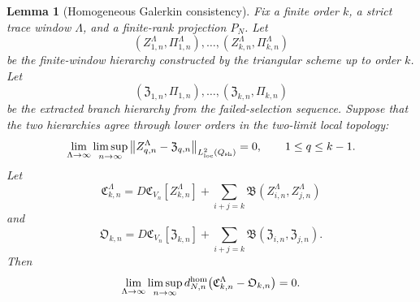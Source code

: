\documentclass[11pt]{article}
\numberwithin{equation}{section}
\theoremstyle{plain}
\newtheorem{lemma}{Lemma}[section]
\theoremstyle{definition}
\theoremstyle{remark}
\newcommand{\norm}[2]{\left\|#1\right\|_{#2}}
\newcommand{\calB}{\mathfrak B}
\newcommand{\calC}{\mathfrak C}
\newcommand{\frakZ}{\mathfrak Z}
\newcommand{\frakPi}{\mathfrak{\Pi}}
\newcommand{\Ored}{\mathfrak O}
\begin{document}
\begin{lemma}[Homogeneous Galerkin consistency]\label{pIV:lem:homogeneous-galerkin-consistency}
Fix a finite order \(k\), a strict trace window \(\Lambda\), and a finite-rank
projection \(P_N\).  Let
\[
        (Z^\Lambda_{1,n},\Pi^\Lambda_{1,n}),\ldots,
        (Z^\Lambda_{k,n},\Pi^\Lambda_{k,n})
\]
be the finite-window hierarchy constructed by the triangular scheme up to order
\(k\).  Let
\[
        (\frakZ_{1,n},\frakPi_{1,n}),\ldots,
        (\frakZ_{k,n},\frakPi_{k,n})
\]
be the extracted branch hierarchy from the failed-selection sequence.  Suppose that
the two hierarchies agree through lower orders in the two-limit local topology:
\begin{equation}\label{pIV:eq:hom-galerkin-lower}
        \lim_{\Lambda\to\infty}\limsup_{n\to\infty}
        \norm{Z^\Lambda_{q,n}-\frakZ_{q,n}}{L^2_{\rm loc}(Q_{\rm sh})}=0,
        \qquad
        1\le q\le k-1.
\end{equation}
Let
\begin{equation}\label{pIV:eq:hom-window-coeff}
        \calC^\Lambda_{k,n}
        =D\calC_{V_n}[Z^\Lambda_{k,n}]
        +
        \sum_{i+j=k}\calB(Z^\Lambda_{i,n},Z^\Lambda_{j,n})
\end{equation}
and
\begin{equation}\label{pIV:eq:hom-branch-coeff}
        \Ored_{k,n}
        =D\calC_{V_n}[\frakZ_{k,n}]
        +
        \sum_{i+j=k}\calB(\frakZ_{i,n},\frakZ_{j,n}).
\end{equation}
Then
\begin{equation}\label{pIV:eq:hom-galerkin-consistency-result}
        \lim_{\Lambda\to\infty}\limsup_{n\to\infty}
        d^{\rm hom}_{N,n}
        \bigl(\calC^\Lambda_{k,n}-\Ored_{k,n}\bigr)
        =0 .
\end{equation}
\end{lemma}
\end{document}

